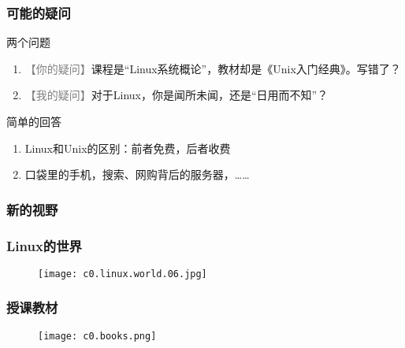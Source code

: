 \begin{frame}
  \frametitle{可能的疑问}
  \begin{block}{两个问题}
  \begin{enumerate}
    \item \textcolor{gray}{【你的疑问】}课程是“Linux系统概论”，教材却是《Unix入门经典》。写错了？
    \item \textcolor{gray}{【我的疑问】}对于Linux，你是闻所未闻，还是“日用而不知”？
  \end{enumerate}
\end{block}
  \pause
  \begin{block}{简单的回答}
  \begin{enumerate}
    \item Linux和Unix的区别：前者免费，后者收费
    \item 口袋里的手机，搜索、网购背后的服务器，……
  \end{enumerate}
\end{block}
\end{frame}

\begin{frame}
  \frametitle{新的视野}
  \begin{figure}
    \centering
    \quad
  \end{figure}
\end{frame}

\begin{frame}
  \frametitle{Linux的世界}
  \begin{figure}
    \centering
    \texttt{[image: c0.linux.world.06.jpg]}
  \end{figure}
\end{frame}

\begin{frame}
  \frametitle{授课教材}
  \begin{figure}
    \centering
    \texttt{[image: c0.books.png]}
  \end{figure}
\end{frame}

